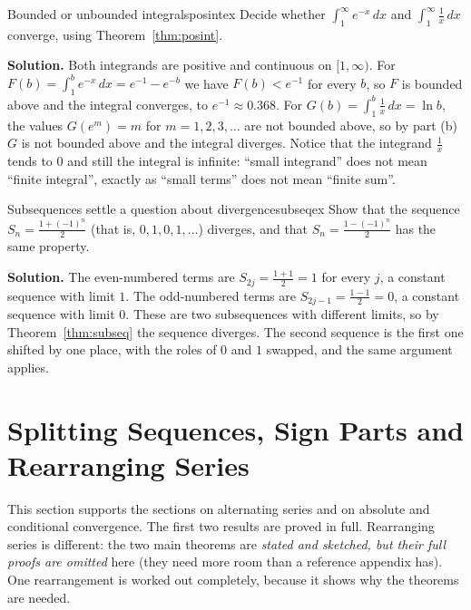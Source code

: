 \documentclass[11pt]{article}
\begin{document}
\begin{exmp}{Bounded or unbounded integrals}{posintex}
Decide whether $\int_1^\infty e^{-x}\,dx$ and $\int_1^\infty\frac1x\,dx$ converge, using Theorem~\ref{thm:posint}.

\textbf{Solution.} Both integrands are positive and continuous on $[1,\infty)$. For $F(b)=\int_1^be^{-x}\,dx=e^{-1}-e^{-b}$ we have $F(b)<e^{-1}$ for every $b$, so $F$ is bounded above and the integral converges, to $e^{-1}\approx0.368$.
For $G(b)=\int_1^b\frac1x\,dx=\ln b$, the values $G(e^m)=m$ for $m=1,2,3,\dots$ are not bounded above, so by part (b) $G$ is not bounded above and the integral diverges. Notice that the integrand $\frac1x$ tends to $0$ and still the integral is infinite: ``small integrand'' does not mean ``finite integral'', exactly as ``small terms'' does not mean ``finite sum''.
\end{exmp}

\begin{exmp}{Subsequences settle a question about divergence}{subseqex}
Show that the sequence $S_n=\frac{1+(-1)^n}2$ (that is, $0,1,0,1,\dots$) diverges, and that $S_n=\frac{1-(-1)^n}2$ has the same property.

\textbf{Solution.} The even-numbered terms are $S_{2j}=\frac{1+1}2=1$ for every $j$, a constant sequence with limit $1$. The odd-numbered terms are $S_{2j-1}=\frac{1-1}2=0$, a constant sequence with limit $0$. These are two subsequences with different limits, so by Theorem~\ref{thm:subseq} the sequence diverges.
The second sequence is the first one shifted by one place, with the roles of $0$ and $1$ swapped, and the same argument applies.
\end{exmp}

\section{Splitting Sequences, Sign Parts and Rearranging Series}

This section supports the sections on alternating series and on absolute and conditional convergence. The first two results are proved in full. Rearranging series is different: the two main theorems are \emph{stated and sketched, but their full proofs are omitted} here (they need more room than a reference appendix has). One rearrangement is worked out completely, because it shows why the theorems are needed.
\end{document}
